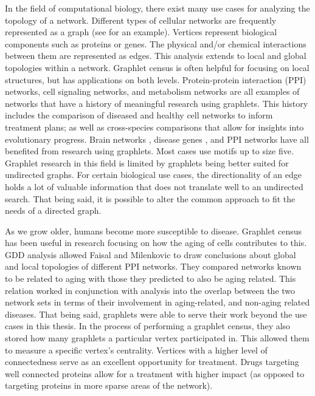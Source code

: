 \documentclass[12pt,twoside]{reedthesis}
\begin{document}
In the field of computational biology, there exist many use cases for analyzing the topology of a network. Different types of cellular networks are frequently represented as a graph (see \citeauthor{bio_graphlets} \cite{bio_graphlets} for an example). Vertices represent biological components such as proteins or genes. The physical and/or chemical interactions between them are represented as edges. This analysis extends to local and global topologies within a network. Graphlet census is often helpful for focusing on local structures, but has applications on both levels. Protein-protein interaction (PPI) networks, cell signaling networks, and metabolism networks are all examples of networks that have a history of meaningful research using graphlets. This history includes the comparison of diseased and healthy cell networks to inform treatment plans; as well as cross-species comparisons that allow for insights into evolutionary progress. Brain networks \cite{bio_brain}, disease genes \cite{bio_disease}, and PPI networks \cite{bio_graphlets} have all benefited from research using graphlets. Most cases use motifs up to size five. Graphlet research in this field is limited by graphlets being better suited for undirected graphs. For certain biological use cases, the directionality of an edge holds a lot of valuable information that does not translate well to an undirected search. That being said, it is possible to alter the common approach to fit the needs of a directed graph.

As we grow older, humans become more susceptible to disease. Graphlet census has been useful in research focusing on how the aging of cells contributes to this. GDD analysis allowed Faisal and Milenkovic \cite{bio_aging} to draw conclusions about global and local topologies of different PPI networks. They compared networks known to be related to aging with those they predicted to also be aging related. This relation worked in conjunction with analysis into the overlap between the two network sets in terms of their involvement in aging-related, and non-aging related diseases. That being said, graphlets were able to serve their work beyond the use cases in this thesis. In the process of performing a graphlet census, they also stored how many graphlets a particular vertex participated in. This allowed them to measure a specific vertex's centrality. Vertices with a higher level of connectedness serve as an excellent opportunity for treatment. Drugs targeting well connected proteins allow for a treatment with higher impact (as opposed to targeting proteins in more sparse areas of the network).
\end{document}
